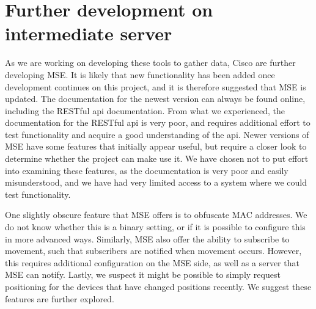 \section{Further development on intermediate server}\label{sec:future_intermediate}
As we are working on developing these tools to gather data, Cisco are further developing MSE. It is likely that new functionality has been added once development continues on this project, and it is therefore suggested that MSE is updated. The documentation for the newest version can always be found online, including the RESTful api documentation. From what we experienced, the documentation for the RESTful api is very poor, and requires additional effort to test functionality and acquire a good understanding of the api. Newer versions of MSE have some features that initially appear useful, but require a closer look to determine whether the project can make use it. We have chosen not to put effort into examining these features, as the documentation is very poor and easily misunderstood, and we have had very limited access to a system where we could test functionality.

One slightly obscure feature that MSE offers is to obfuscate MAC addresses. We do not know whether this is a binary setting, or if it is possible to configure this in more advanced ways. Similarly, MSE also offer the ability to subscribe to movement, such that subscribers are notified when movement occurs. However, this requires additional configuration on the MSE side, as well as a server that MSE can notify. Lastly, we suspect it might be possible to simply request positioning for the devices that have changed positions recently. We suggest these features are further explored.

 



